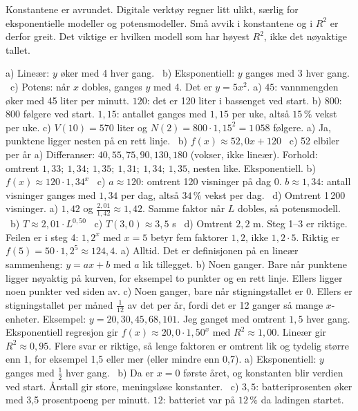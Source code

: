 
Konstantene er avrundet. Digitale verktøy regner litt ulikt, særlig for eksponentielle modeller og potensmodeller. Små avvik i konstantene og i $R^2$ er derfor greit. Det viktige er hvilken modell som har høyest $R^2$, ikke det nøyaktige tallet.

 a) Lineær: $y$ øker med 4 hver gang. \ b) Eksponentiell: $y$ ganges med 3 hver gang. \ c) Potens: når $x$ dobles, ganges $y$ med 4. Det er $y = 5x^2$.
 a) $45$: vannmengden øker med 45 liter per minutt. $120$: det er 120 liter i bassenget ved start.
b) $800$: 800 følgere ved start. $1{,}15$: antallet ganges med $1{,}15$ per uke, altså $15\,\%$ vekst per uke.
c) $V(10) = 570$ liter og $N(2) = 800 \cdot 1{,}15^2 = 1\,058$ følgere.
 a) Ja, punktene ligger nesten på en rett linje. \ b) $f(x) \approx 52{,}0x + 120$ \ c) 52 elbiler per år
 a) Differanser: $40, 55, 75, 90, 130, 180$ (vokser, ikke lineær). Forhold: omtrent $1{,}33;\ 1{,}34;\ 1{,}35;\ 1{,}31;\ 1{,}34;\ 1{,}35$, nesten like. Eksponentiell.
b) $f(x) \approx 120 \cdot 1{,}34^x$ \ c) $a \approx 120$: omtrent 120 visninger på dag 0. $b \approx 1{,}34$: antall visninger ganges med $1{,}34$ per dag, altså $34\,\%$ vekst per dag. \ d) Omtrent 1\,200 visninger.
 a) $1{,}42$ og $\frac{2{,}01}{1{,}42} \approx 1{,}42$. Samme faktor når $L$ dobles, så potensmodell. \ b) $T \approx 2{,}01 \cdot L^{0{,}50}$ \ c) $T(3{,}0) \approx 3{,}5$ s \ d) Omtrent $2{,}2$ m.
 Steg 1–3 er riktige. Feilen er i steg 4: $1{,}2^x$ med $x = 5$ betyr fem faktorer $1{,}2$, ikke $1{,}2 \cdot 5$. Riktig er $f(5) = 50 \cdot 1{,}2^5 \approx 124{,}4$.
 a) Alltid. Det er definisjonen på en lineær sammenheng: $y = ax + b$ med $a$ lik tillegget.
b) Noen ganger. Bare når punktene ligger nøyaktig på kurven, for eksempel to punkter og en rett linje. Ellers ligger noen punkter ved siden av.
c) Noen ganger, bare når stigningstallet er 0. Ellers er stigningstallet per måned $\frac{1}{12}$ av det per år, fordi det er 12 ganger så mange $x$-enheter.
 Eksempel: $y = 20, 30, 45, 68, 101$. Jeg ganget med omtrent $1{,}5$ hver gang. Eksponentiell regresjon gir $f(x) \approx 20{,}0 \cdot 1{,}50^x$ med $R^2 \approx 1{,}00$. Lineær gir $R^2 \approx 0{,}95$. Flere svar er riktige, så lenge faktoren er omtrent lik og tydelig større enn 1, for eksempel 1,5 eller mer (eller mindre enn 0,7).
 a) Eksponentiell: $y$ ganges med $\frac{1}{2}$ hver gang. \ b) Da er $x = 0$ første året, og konstanten blir verdien ved start. Årstall gir store, meningsløse konstanter. \ c) $3{,}5$: batteriprosenten øker med 3,5 prosentpoeng per minutt. $12$: batteriet var på $12\,\%$ da ladingen startet.

